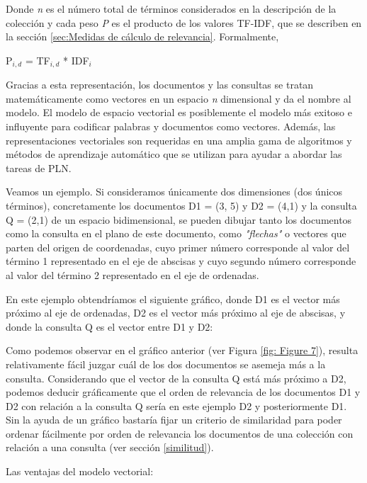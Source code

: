 \documentclass[titlepage]{article}
\begin{document}
	
	Donde \textit{n} es el número total de términos considerados en la descripción de la colección y cada peso \textit{P} es el producto de los valores TF-IDF\label{TF-IDF}, que se describen en la sección \ref{sec:Medidas de cálculo de relevancia}. Formalmente,
	
	\begin{center}
		P$_{i, d}$ = TF$_{i, d}$ * IDF$_{i}$
	\end{center}
	
	Gracias a esta representación, los documentos y las consultas se tratan matemáticamente como vectores en un espacio \textit{n} dimensional y da el nombre al modelo. El modelo de espacio vectorial es posiblemente el modelo más exitoso e influyente para codificar palabras y documentos como vectores. Además, las representaciones vectoriales son requeridas en una amplia gama de algoritmos y métodos de aprendizaje automático que se utilizan para ayudar a abordar las tareas de PLN.
	
	Veamos un ejemplo. Si consideramos únicamente dos dimensiones (dos únicos términos), concretamente los documentos D1 = (3, 5) y D2 = (4,1) y la consulta Q = (2,1) de un espacio bidimensional, se pueden dibujar tanto los documentos como la consulta en el plano de este documento, como \textit{"flechas"} o vectores que parten del origen de coordenadas, cuyo primer número corresponde al valor del término 1 representado en el eje de abscisas y cuyo segundo número corresponde al valor del término 2 representado en el eje de ordenadas. 
	
	\newpage
	En este ejemplo obtendríamos el siguiente gráfico, donde D1 es el vector más próximo al eje de ordenadas, D2 es el vector más próximo al eje de abscisas, y donde la consulta Q es el vector entre D1 y D2:
	
	
	Como podemos observar en el gráfico anterior (ver Figura \ref{fig: Figure 7}), resulta relativamente fácil juzgar cuál de los dos documentos se asemeja más a la consulta. Considerando que el vector de la consulta Q está más próximo a D2, podemos deducir gráficamente que el orden de relevancia de los documentos D1 y D2 con relación a la consulta Q sería en este ejemplo D2 y posteriormente D1. Sin la ayuda de un gráfico bastaría fijar un criterio de similaridad para poder ordenar fácilmente por orden de relevancia los documentos de una colección con relación a una consulta (ver sección \ref{similitud}).
	
	Las ventajas del modelo vectorial:
	
\end{document}
